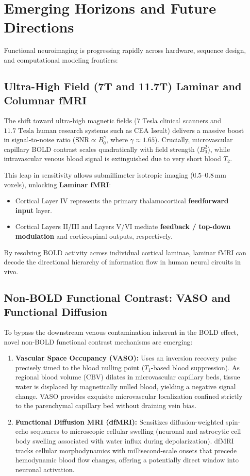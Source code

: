 \documentclass[11pt,a4paper]{article}
\begin{document}
\section{Emerging Horizons and Future Directions}
Functional neuroimaging is progressing rapidly across hardware, sequence design, and computational modeling frontiers:

\subsection{Ultra-High Field (7T and 11.7T) Laminar and Columnar fMRI}
The shift toward ultra-high magnetic fields (7 Tesla clinical scanners and $11.7\text{ Tesla}$ human research systems such as CEA Iseult) delivers a massive boost in signal-to-noise ratio ($\text{SNR} \propto B_0^\gamma$, where $\gamma \approx 1.65$). Crucially, microvascular capillary BOLD contrast scales quadratically with field strength ($B_0^2$), while intravascular venous blood signal is extinguished due to very short blood $T_2$.

This leap in sensitivity allows submillimeter isotropic imaging ($0.5\text{--}0.8\,\text{mm}$ voxels), unlocking \textbf{Laminar fMRI}:
\begin{itemize}
    \item Cortical Layer IV represents the primary thalamocortical \textbf{feedforward input} layer.
    \item Cortical Layers II/III and Layers V/VI mediate \textbf{feedback / top-down modulation} and corticospinal outputs, respectively.
\end{itemize}
By resolving BOLD activity across individual cortical laminae, laminar fMRI can decode the directional hierarchy of information flow in human neural circuits in vivo.

\subsection{Non-BOLD Functional Contrast: VASO and Functional Diffusion}
To bypass the downstream venous contamination inherent in the BOLD effect, novel non-BOLD functional contrast mechanisms are emerging:
\begin{enumerate}
    \item \textbf{Vascular Space Occupancy (VASO):} Uses an inversion recovery pulse precisely timed to the blood nulling point ($T_1$-based blood suppression). As regional blood volume ($\text{CBV}$) dilates in microvascular capillary beds, tissue water is displaced by magnetically nulled blood, yielding a negative signal change. VASO provides exquisite microvascular localization confined strictly to the parenchymal capillary bed without draining vein bias.
    \item \textbf{Functional Diffusion MRI (dfMRI):} Sensitizes diffusion-weighted spin-echo sequences to microscopic cellular swelling (neuronal and astrocytic cell body swelling associated with water influx during depolarization). dfMRI tracks cellular morphodynamics with millisecond-scale onsets that precede hemodynamic blood flow changes, offering a potentially direct window into neuronal activation.
\end{enumerate}
\end{document}
